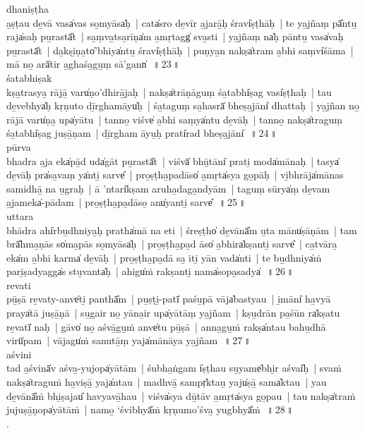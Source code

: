\documentclass[parskip, DIV=14]{scrartcl}
\begin{document}
{dhaniṣṭha  \\
a̱ṣṭau de̱vā vasa̍vas so̱myāsa̍ḥ~|  cata̍sro de̱vīr a̱jarā̱ḥ śravi̍ṣṭhāḥ~|  te ya̱jñaṃ pā̎ntu̱ raja̍saḥ pu̱rastā̎t~|  sa̱ṃva̱tsa̱rīṇa̍m a̱mṛtagg̍ sva̱sti~|  ya̱jñaṃ na̍ḥ pāntu̱ vasa̍vaḥ pu̱rastā̎t~|  da̱kṣi̱ṇa̱to̍'bhiya̍ntu̱ śravi̍ṣṭhāḥ~|  puṇya̱n nakṣa̍tram a̱bhi saṃvi̍śāma~|  mā no̱ arā̍tir a̱ghaśa̱gu̱ṃ sā'gann̍~\,॥\,23\,॥ \\

śatabhiṣak  \\
kṣa̱trasya̱ rājā̱ varu̍ṇo'dhirā̱jaḥ~|  nakṣa̍trāṇāguṃ śa̱tabhi̍ṣag vasi̍ṣṭhaḥ~|  tau de̱vebhya̍ḥ kṛṇuto dī̱rghamāyu̍ḥ~|  śa̱taguṃ sa̱hasrā̍ bheṣa̱jāni̍ dhattaḥ~|  ya̱jñan no̱ rājā varu̍ṇa̱ upa̍yātu~|  tanno̱ viśve̍ a̱bhi saṃya̍ntu de̱vāḥ~|  tanno̱ nakṣa̍traguṃ śa̱tabhi̍ṣag juṣā̱ṇam~|  dī̱rgham āyu̱ḥ prati̍rad bheṣa̱jāni̍~\,॥\,24\,॥ \\

pūrva  \\
bhadra a̱ja eka̍pā̱d uda̍gāt pu̱rastā̎t~|  viśvā̍ bhū̱tāni̍ prati̱ moda̍mānaḥ~|  tasya̍ de̱vāḥ pra̍sa̱vaṃ ya̍nti̱ sarve̎~|  pro̱ṣṭha̱padāso̍ a̱mṛta̍sya go̱pāḥ~|  vi̱bhrāja̍mānas samidhā̱ na u̱graḥ~|  ā 'ntari̍kṣam aruha̱daga̱ndyām~|  taguṃ sūrya̍ṃ de̱vam a̱jameka̍-pādam~|  pro̱ṣṭha̱pa̱dāso̱ anu̍yanti̱ sarve̎~\,॥\,25\,॥ \\

uttara  \\
bhādra ahi̍rbu̱dhniya̱ḥ pratha̍mā na eti~|  śreṣṭho̍ de̱vānā̎m u̱ta mānu̍ṣāṇām~|  tam brā̎hma̱ṇās so̍ma̱pās so̱myāsa̍ḥ~|  pro̱ṣṭha̱pa̱d āso̍ a̱bhira̍kṣanti̱ sarve̎~|  ca̱tvāra̱ eka̍m a̱bhi karma̍ de̱vāḥ~|  pro̱ṣṭha̱pa̱dā sa̱ iti̱ yān vada̍nti~|  te bu̱dhniya̍ṁ pari̱ṣadyagga̍s stu̱vanta̍ḥ~|  ahigu̍ṁ rakṣanti̱ nama̍sopa̱sadya̍~\,॥\,26\,॥ \\

revati  \\
pū̱ṣā re̱vaty-anve̍ti̱ panthā̎m~|  pu̱ṣṭi̱-patī̍ paśu̱pā vāja̍bastyau~|  i̱māni̍ ha̱vyā praya̍tā juṣā̱ṇā~|  su̱gair no̱ yāna̱ir upa̍yātāṃ ya̱jñam~|  kṣu̱drān pa̱śūn ra̍kṣatu re̱vatī̍ naḥ~|  gāvo̍ no̱ aśvā̱gu̱ṁ anve̍tu pū̱ṣā~|  anna̱gu̱ṁ rakṣa̍ntau bahu̱dhā virū̍pam~|  vājagu̍ṁ sanutā̱ṃ yaja̍mānāya ya̱jñam~\,॥\,27\,॥ \\

aśvini  \\
tad a̱śvinā̍v aśva̱-yujopa̍yātām~|  śubha̱ṅgam i̍ṣṭhau su̱yame̍bhi̱r aśvai̎ḥ~|  svaṁ nakṣa̍traguṁ ha̱viṣā̱ yaja̍ntau~|  madhvā̱ sampṛ̍ktau̱ yaju̍ṣā̱ sama̍ktau~|  yau de̱vānā̎ṁ bhi̱ṣajau̎ havyavā̱hau~|  viśva̍sya dū̱tāv a̱mṛta̍sya go̱pau~|  tau nakṣa̍traṁ jujuṣā̱ṇopa̍yātāṁ~|  namo̱ ‘śvibhyā̎ṁ kṛṇumo’śva̱ yugbhyā̎ṁ~\,॥\,28\,॥ \\.

}
\end{document}

